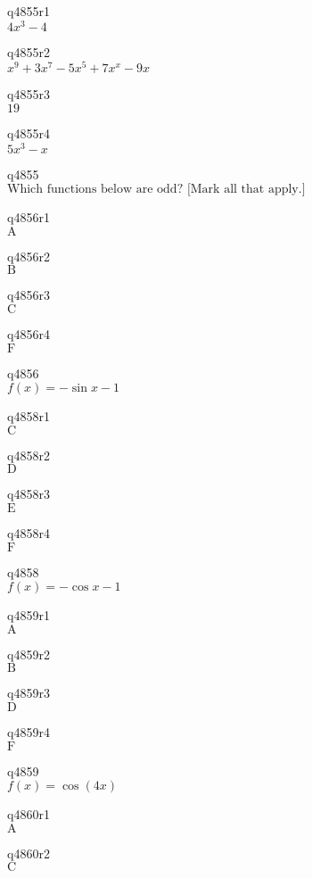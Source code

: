 q4855r1\\
\(\displaystyle 4x^3 - 4 \)

q4855r2\\
\(\displaystyle x^9 + 3x^7 - 5x^5 + 7x^x - 9x \)

q4855r3\\
\(\displaystyle 19 \)

q4855r4\\
\(\displaystyle 5x^3 - x \)

q4855\\
\(\displaystyle \text{Which functions below are odd? [Mark all that apply.]} \)

q4856r1\\
\(\displaystyle \text{A} \)

q4856r2\\
\(\displaystyle \text{B} \)

q4856r3\\
\(\displaystyle \text{C} \)

q4856r4\\
\(\displaystyle \text{F} \)

q4856\\
\(\displaystyle f(x) = -\sin x - 1 \)

q4858r1\\
\(\displaystyle \text{C} \)

q4858r2\\
\(\displaystyle \text{D} \)

q4858r3\\
\(\displaystyle \text{E} \)

q4858r4\\
\(\displaystyle \text{F} \)

q4858\\
\(\displaystyle f(x) = -\cos x - 1 \)

q4859r1\\
\(\displaystyle \text{A} \)

q4859r2\\
\(\displaystyle \text{B} \)

q4859r3\\
\(\displaystyle \text{D} \)

q4859r4\\
\(\displaystyle \text{F} \)

q4859\\
\(\displaystyle f(x) = \cos (4x) \)

q4860r1\\
\(\displaystyle \text{A} \)

q4860r2\\
\(\displaystyle \text{C} \)

